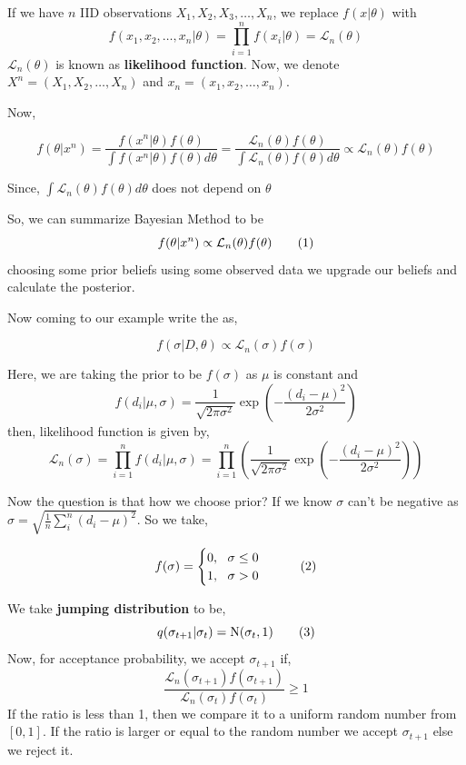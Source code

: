 \begin{example}
	If we have $ n $ IID observations $ X_1,X_2,X_3,\ldots,X_n $, we replace $ f(x|\theta) $ with
	\[
		f(x_1,x_2,\ldots,x_n|\theta) = \prod_{i=1}^{n} f(x_i|\theta) = \mathcal{L}_n(\theta)
	\]
	$ \mathcal{L}_n(\theta) $ is known as \textbf{likelihood function}. Now, we denote $ X^{n} = (X_1,X_2,\ldots,X_n) $ and $ x_n = (x_1,x_2,\ldots,x_n) $.

	Now,

	\begin{equation}
		f(\theta|x^{n} ) = \frac{f(x^{n}|\theta)f(\theta) }{\int f(x^{n}|\theta)f(\theta)d \theta } = \frac{\mathcal{L}_n(\theta)f(\theta)}{\int \mathcal{L}_n(\theta) f(\theta)d \theta} \propto \mathcal{L}_n(\theta)f(\theta)
	\end{equation}

	Since, $ \int \mathcal{L}_n(\theta)f(\theta)d \theta  $ does not depend on $ \theta $

	So, we can summarize Bayesian Method to be
	\[
		f(\theta|x^{n} ) \propto \mathcal{L}_n(\theta)f(\theta) \label{eq:bayesian method} \numberthis
	\]
	choosing some prior beliefs using some observed data we upgrade our beliefs and calculate the posterior.

	Now coming to our example write the  as,

	\[
		f(\sigma|D,\theta) \propto \mathcal{L}_n(\sigma)f(\sigma)
	\]

	Here, we are taking the prior to be $ f(\sigma) $ as $ \mu $ is constant and
	\[
		f(d_i|\mu,\sigma) = \frac{1}{\sqrt{2 \pi \sigma^2}} \exp \left( - \frac{(d_i -\mu )^2}{2 \sigma^2} \right)
	\]
	then, likelihood function is given by,
	\[
		\mathcal{L}_n(\sigma) = \prod_{i=1}^{n} f(d_i|\mu,\sigma) = \prod_{i=1}^{n} \left( \frac{1}{\sqrt{2 \pi \sigma^2}} \exp \left( - \frac{(d_i -\mu )^2}{2 \sigma^2} \right) \right)
	\]

	Now the question is that how we choose prior? If we know $ \sigma $ can't be negative as $ \sigma = \sqrt{ \frac{1}{n} \sum_{i}^{n} (d_i - \mu)^2 } $. So we take,

	\[
		f(\sigma) =
		\begin{cases}
			0, \ \ \sigma \le 0 \\
			1, \ \ \sigma > 0
		\end{cases} \numberthis \label{eq:prior}
	\]

	We take \textbf{jumping distribution}  to be,
	\[
		q(\sigma_{t+1}|\sigma_{t}) = \text{N}(\sigma_t,1) \label{eq:jumping for mh example2} \numberthis
	\]
	Now, for acceptance probability,
	we accept $ \sigma_{t+1} $ if,
	\begin{equation}
		\label{eq:1st accept mh example2}
		\frac{\mathcal{L}_n(\sigma_{t+1})f(\sigma_{t+1})}{\mathcal{L}_n(\sigma_{t})f(\sigma_{t})} \ge 1
	\end{equation}
	If the ratio is less than 1, then we compare it to a uniform random number from $ [0,1] $. If the ratio is larger or equal to the random number we accept $ \sigma_{t+1} $ else we reject it.


\end{example}
